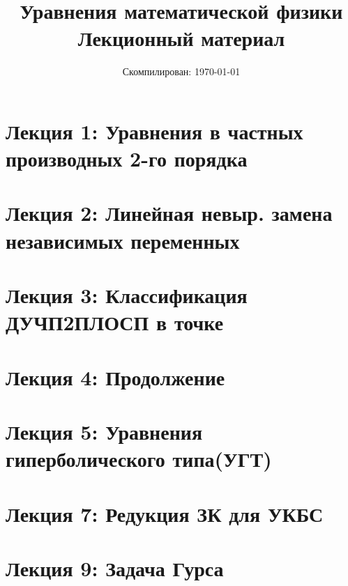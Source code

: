 \documentclass{article}
\title{Уравнения математической физики\\Лекционный материал}
\author{}
\date{Скомпилирован: \today}
\begin{document}
\maketitle

\newpage

\section{Лекция 1: Уравнения в частных производных 2-го порядка}


\section{Лекция 2: Линейная невыр. замена независимых переменных}


\section{Лекция 3: Классификация ДУЧП2ПЛОСП в точке}


\section{Лекция 4: Продолжение}



\section{Лекция 5: Уравнения гиперболического типа(УГТ)}



\section{Лекция 7: Редукция ЗК для УКБС}


\section{Лекция 9: Задача Гурса}

\end{document}
